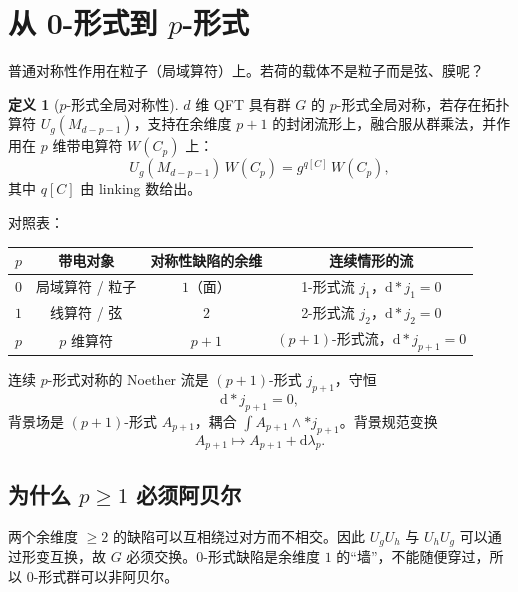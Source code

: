 \documentclass[11pt,a4paper]{article}
\theoremstyle{definition}
\newtheorem{definition}{定义}[section]
\theoremstyle{plain}
\theoremstyle{remark}
\newcommand{\dd}{\mathrm{d}}
\begin{document}
\section{从 0-形式到 $p$-形式}
\label{sec:pform}

普通对称性作用在粒子（局域算符）上。若荷的载体不是粒子而是弦、膜呢？

\begin{definition}[$p$-形式全局对称性]
$d$ 维 QFT 具有群 $G$ 的 $p$-形式全局对称，若存在拓扑算符 $U_g(M_{d-p-1})$，支持在余维度 $p+1$ 的封闭流形上，融合服从群乘法，并作用在 $p$ 维带电算符 $W(C_p)$ 上：
\begin{equation}
\label{eq:linkp}
  U_g(M_{d-p-1})\,W(C_p)= g^{q[C]}\,W(C_p),
\end{equation}
其中 $q[C]$ 由 linking 数给出。
\end{definition}

对照表：

\begin{center}
\begin{tabular}{cccc}
\toprule
$p$ & 带电对象 & 对称性缺陷的余维 & 连续情形的流 \\
\midrule
$0$ & 局域算符 / 粒子 & $1$（面） & 1-形式流 $j_1$，$\dd{*}j_1=0$ \\
$1$ & 线算符 / 弦 & $2$ & 2-形式流 $j_2$，$\dd{*}j_2=0$ \\
$p$ & $p$ 维算符 & $p+1$ & $(p+1)$-形式流，$\dd{*}j_{p+1}=0$ \\
\bottomrule
\end{tabular}
\end{center}

连续 $p$-形式对称的 Noether 流是 $(p+1)$-形式 $j_{p+1}$，守恒
\begin{equation}
  \dd{*}j_{p+1}=0,
\end{equation}
背景场是 $(p+1)$-形式 $A_{p+1}$，耦合 $\int A_{p+1}\wedge{*}j_{p+1}$。背景规范变换
\begin{equation}
  A_{p+1}\mapsto A_{p+1}+\dd\lambda_p.
\end{equation}

\subsection{为什么 $p\ge 1$ 必须阿贝尔}

两个余维度 $\ge 2$ 的缺陷可以互相绕过对方而不相交。因此 $U_{g}U_{h}$ 与 $U_{h}U_{g}$ 可以通过形变互换，故 $G$ 必须交换。$0$-形式缺陷是余维度 $1$ 的``墙''，不能随便穿过，所以 $0$-形式群可以非阿贝尔。
\end{document}
